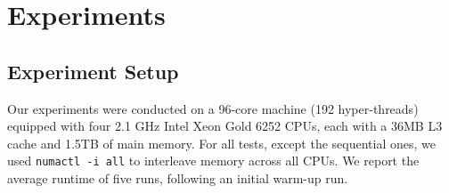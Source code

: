 \section{Experiments}\label{sec:exp}


\subsection{Experiment Setup}
Our experiments were conducted on a 96-core machine (192 hyper-threads) equipped with four 2.1 GHz Intel Xeon Gold 6252 CPUs, 
each with a 36MB L3 cache and 1.5TB of main memory. 
For all tests, except the sequential ones, 
we used \texttt{numactl -i all} to interleave memory across all CPUs. 
We report the average runtime of five runs, following an initial warm-up run.

